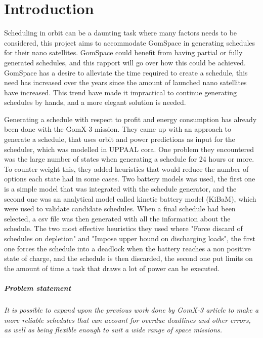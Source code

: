 \chapter{Introduction}\label{cha:intro}
Scheduling in orbit can be a daunting task where many factors needs to be considered, this project aims to accommodate GomSpace in generating schedules for their nano satellites. GomSpace could benefit from having partial or fully generated schedules, and this rapport will go over how this could be achieved. GomSpace has a desire to alleviate the time required to create a schedule, this need has increased over the years since the amount of launched nano satellites have increased. This trend have made it impractical to continue generating schedules by hands, and a more elegant solution is needed.

Generating a schedule with respect to profit and energy consumption has already been done with the GomX-3 mission\cite{gomx3}. They came up with an approach to generate a schedule, that uses orbit and power predictions as input for the scheduler, which was modelled in UPPAAL \gls{cora}. One problem they encountered was the large number of states when generating a schedule for 24 hours or more. To counter weight this, they added heuristics that would reduce the number of options each state had in some cases. Two battery models was used, the first one is a simple model that was integrated with the schedule generator, and the second one was an analytical model called kinetic battery model (KiBaM), which were used to validate candidate schedules. When a final schedule had been selected, a csv file was then generated with all the information about the schedule. The two most effective heuristics they used where "Force discard of schedules on depletion" and "Impose upper bound on discharging loads", the first one forces the schedule into a deadlock when the battery reaches a non positive state of charge, and the schedule is then discarded, the second one put limits on the amount of time a task that draws a lot of power can be executed\cite{gomx3}.


\paragraph{Problem statement}
\textit{It is possible to expand upon the previous work done by GomX-3 article to make a more reliable schedules that can account for overdue deadlines and other errors, as well as being flexible enough to suit a wide range of space missions.}



